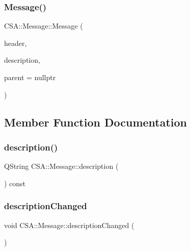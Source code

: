 \subsubsection{\texorpdfstring{Message()}{Message()}\hspace{0.1cm}{\footnotesize\ttfamily [2/2]}}
{\footnotesize\ttfamily C\+S\+A\+::\+Message\+::\+Message (\begin{DoxyParamCaption}\item[{const Q\+String \&}]{header,  }\item[{const Q\+String \&}]{description,  }\item[{Q\+Object $\ast$}]{parent = {\ttfamily nullptr} }\end{DoxyParamCaption})\hspace{0.3cm}{\ttfamily [explicit]}}



\subsection{Member Function Documentation}
\mbox{\label{classCSA_1_1Message_ad5ab91547afc7777c9921c2973418d19}} 
\subsubsection{\texorpdfstring{description()}{description()}}
{\footnotesize\ttfamily Q\+String C\+S\+A\+::\+Message\+::description (\begin{DoxyParamCaption}{ }\end{DoxyParamCaption}) const}

\mbox{\label{classCSA_1_1Message_a3aa4f9f897726496236f8f44e62a2e98}} 
\subsubsection{\texorpdfstring{description\+Changed}{descriptionChanged}}
{\footnotesize\ttfamily void C\+S\+A\+::\+Message\+::description\+Changed (\begin{DoxyParamCaption}{ }\end{DoxyParamCaption})\hspace{0.3cm}{\ttfamily [signal]}}

